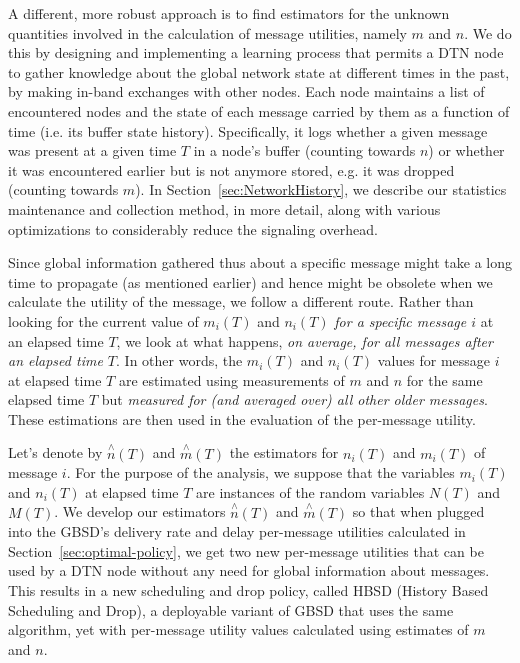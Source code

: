 A different, more robust approach is to find estimators for the unknown quantities involved in the calculation of message utilities, namely $m$ and $n$. We do this by designing and implementing a learning process that permits a DTN node to gather knowledge about the global network state at different times in the past, by making in-band exchanges with other nodes. Each node maintains a list of encountered nodes and the state of each message carried by them as a function of time (i.e. its buffer state history). Specifically, it logs whether a given message was present at a given time $T$ in a node's buffer (counting towards $n$) or whether it was encountered earlier but is not anymore stored, e.g. it was dropped (counting towards $m$). In Section~\ref{sec:NetworkHistory}, we describe our statistics maintenance and collection method, in more detail, along with various optimizations to considerably reduce the signaling overhead.

Since global information gathered thus about a specific message might take a long time to propagate (as mentioned earlier) and hence might be obsolete when we calculate the utility of the message, we follow a different route. Rather than looking for the current value of $m_{i}(T)$ and $n_{i}(T)$ \emph{for a specific message $i$} at an elapsed time $T$, we look at what happens, \emph{on average, for all messages after an elapsed time $T$}. In other words, the $m_i(T)$ and $n_i(T)$ values for message $i$ at elapsed time $T$ are estimated using measurements of $m$ and $n$ for the same elapsed time $T$ but \emph{measured for (and averaged over) all other older messages}. These estimations are then used in the evaluation of the per-message utility.

Let's denote by $\stackrel{\wedge}{n}(T)$ and $\stackrel{\wedge}{m}(T)$ the estimators for $n_i(T)$ and $m_i(T)$ of message $i$. For the purpose of the analysis, we suppose that the variables $m_{i}(T)$ and $n_{i}(T)$ at elapsed time $T$ are instances of the random variables $N(T)$ and $M(T)$. We develop our estimators $\stackrel{\wedge}{n}(T)$ and $\stackrel{\wedge}{m}(T)$ so that when plugged into the GBSD's delivery rate and delay per-message utilities calculated in Section~\ref{sec:optimal-policy}, we get two new per-message utilities that can be used by a DTN node without any need for global information about messages. This results in a new scheduling and drop policy, called HBSD (History Based Scheduling and Drop), a deployable variant of GBSD that uses the same algorithm, yet with per-message utility values calculated using estimates of $m$ and $n$.

